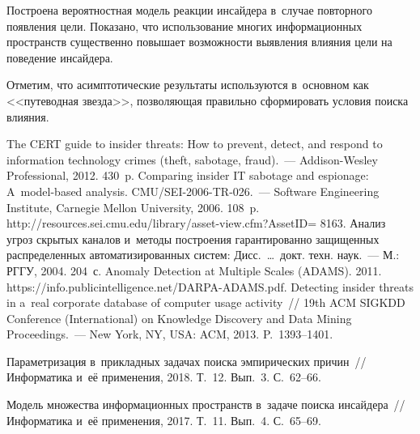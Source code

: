 \begin{multicols}{2}
  Построена вероятностная модель реакции инсайдера в~случае повторного 
появления цели. Показано, что использование многих информационных 
пространств существенно повышает возможности выявления влияния цели на 
поведение инсайдера.
  
  Отметим, что асимптотические результаты используются в~основном как 
<<путеводная звезда>>, позволяющая правильно сформировать условия поиска 
влияния.
  
{\small\frenchspacing
 {%
 \begin{thebibliography}{99}
 The CERT guide to insider threats: How to prevent, detect, 
and respond to information technology crimes (theft, sabotage, fraud).~--- Addison-Wesley 
Professional, 2012. 430~p. 
 Comparing 
insider IT sabotage and espionage: A~model-based analysis. CMU/SEI-2006-TR-026.~--- Software 
Engineering Institute, Carnegie Mellon University, 2006. 108~p. {\sf 
http://\linebreak resources.sei.cmu.edu/library/asset-view.cfm?AssetID= 8163}.
 Анализ угроз скрытых каналов и~методы построения гарантированно 
защищенных распределенных автоматизированных систем: Дисс.\ \ldots\ докт. техн. наук.~--- 
М.: РГГУ, 2004. 204~с.  
Anomaly Detection at Multiple Scales (ADAMS). 2011. {\sf  
https://info.publicintelligence.net/DARPA-ADAMS.pdf}.
Detecting insider threats in a~real corporate database of 
computer usage activity~// 19th ACM SIGKDD Conference (International) on Knowledge Discovery 
and Data Mining Proceedings.~--- New York, NY, USA: ACM, 2013. P.~1393--1401.

 Параметризация в~прикладных задачах поиска эмпирических причин~// 
 Информатика и~её применения, 2018. Т.~12. Вып.~3. С.~62--66.


 Модель множества 
информационных пространств в~задаче поиска инсайдера~// Информатика и~её применения, 
2017. Т.~11. Вып.~4. С.~65--69.


\end{thebibliography}}}
\end{multicols}

